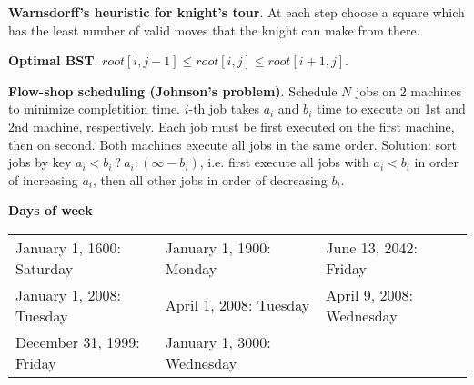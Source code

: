 \documentclass[a4paper, 12pt]{article}
\let\le=\leqslant
\newcommand{\Topic}[1]{\textbf{#1}}
\begin{document}




\Topic{Warnsdorff's heuristic for knight's tour}.
At each step choose a square which has the least number of valid moves
that the knight can make from there.

\Topic{Optimal BST}. $root[i, j-1] \le root[i, j] \le root[i+1, j]$.

\Topic{Flow-shop scheduling (Johnson's problem)}.
Schedule $N$ jobs on $2$ machines to minimize completition time.
$i$-th job takes $a_i$ and $b_i$ time to execute on 1st and 2nd machine, respectively.
Each job must be first executed on the first machine, then on second.
Both machines execute all jobs in the same order.
Solution: sort jobs by key $a_i < b_i\ ?\ a_i : (\infty - b_i)$,
i.e. first execute all jobs with $a_i < b_i$ in order of increasing $a_i$,
then all other jobs in order of decreasing $b_i$.

\Topic{Days of week} \\
\begin{tabular}{l l l}
  January 1, 1600: Saturday &
  January 1, 1900: Monday   &
  June 13, 2042: Friday     \\
  January 1, 2008: Tuesday  &
  April 1, 2008: Tuesday    &
  April 9, 2008: Wednesday  \\
  December 31, 1999: Friday & January 1, 3000: Wednesday
\end{tabular}
\end{document}
